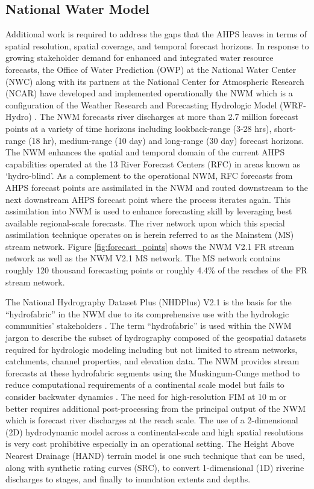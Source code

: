 \documentclass[draft]{dependencies/agujournal2019}
\begin{document}
\subsection{National Water Model}
\label{ssec:national_water_model}
%
Additional work is required to address the gaps that the AHPS leaves in terms of spatial resolution, spatial coverage, and temporal forecast horizons.
In response to growing stakeholder demand for enhanced and integrated water resource forecasts, the Office of Water Prediction (OWP) at the National Water Center (NWC) along with its partners at the National Center for Atmospheric Research (NCAR) have developed and implemented operationally the NWM which is a configuration of the Weather Research and Forecasting Hydrologic Model (WRF-Hydro) \cite{gochis2018wrf,cosgrove2019evolution}. 
The NWM forecasts river discharges at more than 2.7 million forecast points at a variety of time horizons including lookback-range (3-28 hrs), short-range (18 hr), medium-range (10 day) and long-range (30 day) forecast horizons.
The NWM enhances the spatial and temporal domain of the current AHPS capabilities operated at the 13 River Forecast Centers (RFC) in areas known as `hydro-blind'.
As a complement to the operational NWM, RFC forecasts from AHPS forecast points are assimilated in the NWM and routed downstream to the next downstream AHPS forecast point where the process iterates again.
This assimilation into NWM is used to enhance forecasting skill by leveraging best available regional-scale forecasts.
The river network upon which this special assimilation technique operates on is herein referred to as the Mainstem (MS) stream network.
Figure \ref{fig:forecast_points} shows the NWM V2.1 FR stream network as well as the NWM V2.1 MS network.
The MS network contains roughly 120 thousand forecasting points or roughly 4.4\% of the reaches of the FR stream network.

The National Hydrography Dataset Plus (NHDPlus) V2.1 is the basis for the ``hydrofabric'' in the NWM due to its comprehensive use with the hydrologic communities' stakeholders \cite{mckay2012nhdplus,nhdplus2022vectors}. 
The term ``hydrofabric'' is used within the NWM jargon to describe the subset of hydrography composed of the geospatial datasets required for hydrologic modeling including but not limited to stream networks, catchments, channel properties, and elevation data. 
The NWM provides stream forecasts at these hydrofabric segments using the Muskingum-Cunge method to reduce computational requirements of a continental scale model but fails to consider backwater dynamics \cite{bedient2008hydrology,ponce1994variable,gochis2018wrf}.
The need for high-resolution FIM at 10 m or better requires additional post-processing from the principal output of the NWM which is forecast river discharges at the reach scale.
The use of a 2-dimensional (2D) hydrodynamic model across a continental-scale and high spatial resolutions is very cost prohibitive especially in an operational setting.
The Height Above Nearest Drainage (HAND) terrain model is one such technique that can be used, along with synthetic rating curves (SRC), to convert 1-dimensional (1D) riverine discharges to stages, and finally to inundation extents and depths.
%
\end{document}
